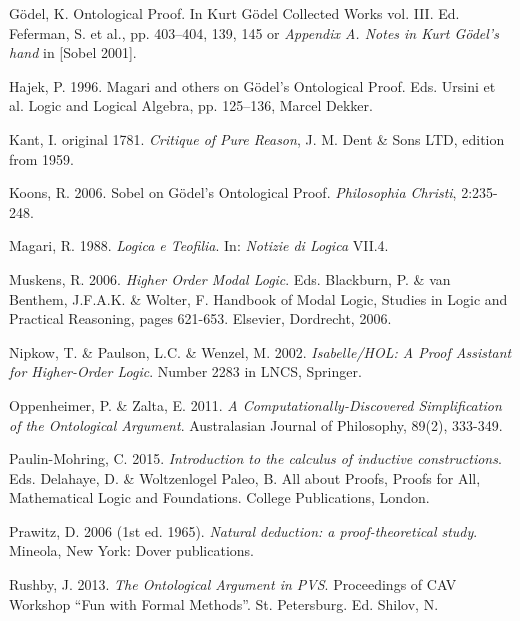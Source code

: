\documentclass[smallextended]{svjour3}
\begin{document}
\begin{thebibliography}{9}
G\"odel, K. Ontological Proof. In Kurt G\"odel Collected Works vol. III. Ed. Feferman, S. et al., pp. 403--404, 139, 145 or {\itshape Appendix A. Notes in Kurt G\"odel's hand} in [Sobel 2001]. 

Hajek, P. 1996. Magari and others on G\"odel's Ontological Proof. Eds. Ursini et al. Logic and Logical Algebra, pp. 125--136, Marcel Dekker.

Kant, I.  original 1781. {\itshape Critique of Pure Reason}, J. M. Dent \& Sons LTD, edition from 1959.

Koons, R. 2006. Sobel on G\"odel's Ontological Proof. {\itshape Philosophia Christi}, 2:235-248.

Magari, R. 1988. {\itshape Logica e Teofilia}. In: {\itshape Notizie di Logica} VII.4.

Muskens, R. 2006. {\itshape Higher Order Modal Logic}. Eds. Blackburn, P. \& van Benthem, J.F.A.K. \& Wolter, F. Handbook of Modal Logic, Studies in Logic and Practical Reasoning, pages 621-653. Elsevier, Dordrecht, 2006.

 Nipkow, T. \& Paulson, L.C. \& Wenzel, M. 2002. {\itshape Isabelle/HOL: A Proof Assistant for
Higher-Order Logic}. Number 2283 in LNCS, Springer.

Oppenheimer, P. \& Zalta, E. 2011. {\itshape A Computationally-Discovered Simplification of the Ontological Argument}. Australasian Journal of Philosophy, 89(2), 333-349.

 Paulin-Mohring, C. 2015. {\itshape Introduction to the calculus of inductive constructions}. Eds. Delahaye, D. \& Woltzenlogel Paleo, B. 
All about Proofs, Proofs for All,
Mathematical Logic and Foundations. College Publications, London.

Prawitz, D. 2006 (1st ed. 1965). {\itshape Natural deduction: a proof-theoretical study}. Mineola, New York: Dover publications. 

Rushby, J. 2013. {\itshape The Ontological Argument in PVS}. Proceedings of CAV Workshop ``Fun with Formal Methods''. St. Petersburg. Ed. Shilov, N. 



\end{thebibliography}
\end{document}
